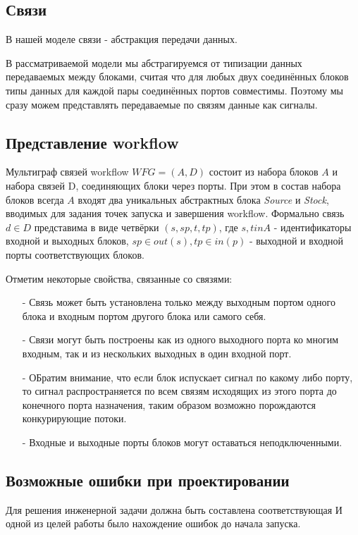 \documentclass[a4paper,14pt]{article}
\begin{document}
\subsection{Связи} 
В нашей моделе связи - абстракция передачи данных.

В рассматриваемой модели мы абстрагируемся от типизации данных передаваемых между блоками, считая что для любых двух соединённых блоков типы данных для каждой пары соединённых портов совместимы. Поэтому мы сразу можем представлять передаваемые по связям данные как сигналы.

\subsection{Представление workflow}

 Мультиграф связей workflow $WFG =(A, D)$ состоит из набора блоков $A$ и набора связей D, соединяющих блоки через порты.
 При этом в состав набора блоков всегда $A$ входят два уникальных абстрактных блока \textit{Source} и \textit{Stock}, вводимых для задания точек запуска и завершения workflow.
 Формально связь $d \in D$ представима в виде четвёрки $(s, sp, t, tp)$, где $s,t in A$ - идентификаторы входной и выходных блоков,  $sp \in out(s),tp \in in(p)$ - выходной и входной порты соответствующих блоков. 
 
Отметим некоторые свойства, связанные со связями:
\begin{enumerate}
\item[-] Связь может быть установлена только между выходным портом одного блока и входным портом другого блока или самого себя.
\item[-] Связи могут быть построены как из одного выходного порта ко многим входным, так и из нескольких выходных в один входной порт.
\item[-]ОБратим внимание, что если блок испускает сигнал по какому либо порту, то сигнал распространяется по всем связям исходящих из этого порта до конечного порта назначения, таким образом возможно порождаются конкурирующие потоки.
\item[-] Входные и выходные порты блоков могут оставаться неподключенными.
\end{enumerate} 
 
 
 
 
\subsection{Возможные ошибки при проектировании}
Для решения инженерной задачи должна быть составлена соответствующая  И одной из целей работы было нахождение ошибок до начала запуска.
\end{document}

